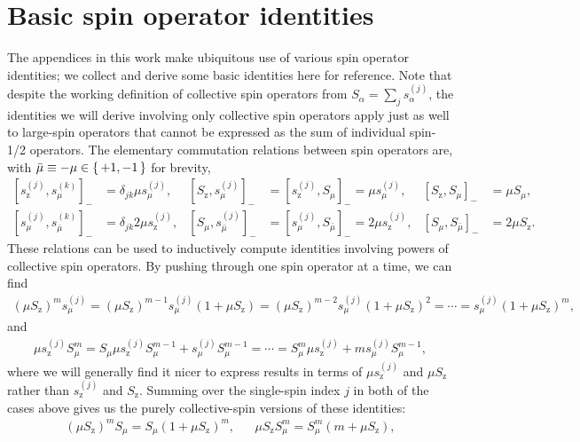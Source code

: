 \documentclass[aps,pra,twocolumn,longbibliography]{revtex4-2}
\newcommand{\p}[1]{\left( #1 \right)} %
\renewcommand{\sp}[1]{\left[ #1 \right]} %
\newcommand{\z}{\text{z}}
\newcommand{\bmu}{{\bar\mu}}
\newcommand{\1}{\mathds{1}}
\renewcommand{\a}{\alpha} %
\begin{document}
\vfill
\onecolumngrid
\appendix

\section{Basic spin operator identities}
\label{sec:identities}

The appendices in this work make ubiquitous use of various spin
operator identities; we collect and derive some basic identities here
for reference.  Note that despite the working definition of collective
spin operators from $S_\a=\sum_js_\a^{(j)}$, the identities we will
derive involving only collective spin operators apply just as well to
large-spin operators that cannot be expressed as the sum of individual
spin-1/2 operators.  The elementary commutation relations between spin
operators are, with $\bmu\equiv-\mu\in\set{+1,-1}$ for brevity,
\begin{align}
  \sp{s_\z^{(j)},s_\mu^{(k)}}_-
  &= \delta_{jk} \mu s_\mu^{(j)},
  &
  \sp{S_\z,s_\mu^{(j)}}_-
  &= \sp{s_\z^{(j)},S_\mu}_- = \mu s_\mu^{(j)},
  &
  \sp{S_\z,S_\mu}_-
  &= \mu S_\mu,
  \label{eq:comm_z_base} \\
  \sp{s_\mu^{(j)},s_\bmu^{(k)}}_-
  &= \delta_{jk} 2 \mu s_\z^{(j)},
  &
  \sp{S_\mu,s_\bmu^{(j)}}_-
  &= \sp{s_\mu^{(j)},S_\bmu}_- = 2 \mu s_\z^{(j)},
  &
  \sp{S_\mu,S_\bmu}_-
  &= 2 \mu S_\z.
  \label{eq:comm_mu_base}
\end{align}
These relations can be used to inductively compute identities
involving powers of collective spin operators.  By pushing through one
spin operator at a time, we can find
\begin{align}
  \p{\mu S_\z}^m s_\mu^{(j)}
  = \p{\mu S_\z}^{m-1} s_\mu^{(j)} \p{1 + \mu S_\z}
  = \p{\mu S_\z}^{m-2} s_\mu^{(j)} \p{1 + \mu S_\z}^2
  = \cdots
  = s_\mu^{(j)} \p{1 + \mu S_\z}^m,
  \label{eq:push_z_mu_Ss}
\end{align}
and
\begin{align}
  \mu s_\z^{(j)} S_\mu^m
  = S_\mu \mu s_\z^{(j)} S_\mu^{m-1} + s_\mu^{(j)} S_\mu^{m-1}
  = \cdots
  = S_\mu^m \mu s_\z^{(j)} + ms_\mu^{(j)} S_\mu^{m-1},
  \label{eq:push_z_mu_sS}
\end{align}
where we will generally find it nicer to express results in terms of
$\mu s_\z^{(j)}$ and $\mu S_\z$ rather than $s_\z^{(j)}$ and $S_\z$.
Summing over the single-spin index $j$ in both of the cases above
gives us the purely collective-spin versions of these identities:
\begin{align}
  \p{\mu S_\z}^m S_\mu = S_\mu \p{1 + \mu S_\z}^m,
  &&
  \mu S_\z S_\mu^m = S_\mu^m \p{m + \mu S_\z},
  \label{eq:push_z_mu_single}
\end{align}
\end{document}

